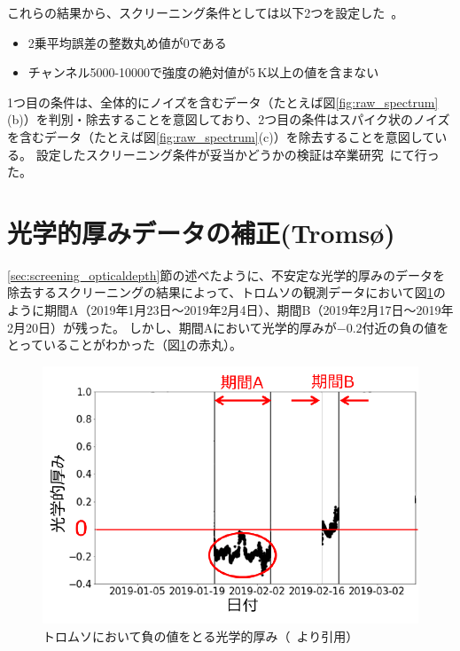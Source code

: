 これらの結果から、スクリーニング条件としては以下2つを設定した~\cite{goto2021bachelor}。
\begin{itemize}
    \item 2乗平均誤差の整数丸め値が0である
    \item チャンネル5000-10000で強度の絶対値が$5\, \mathrm{K}$以上の値を含まない
\end{itemize}
1つ目の条件は、全体的にノイズを含むデータ（たとえば図\ref{fig:raw_spectrum}(b)）を判別・除去することを意図しており、2つ目の条件はスパイク状のノイズを含むデータ（たとえば図\ref{fig:raw_spectrum}(c)）を除去することを意図している。
設定したスクリーニング条件が妥当かどうかの検証は卒業研究~\cite{goto2021bachelor}にて行った。


\section{光学的厚みデータの補正(Troms\o)}
\label{sec:correction_opticaldepth}
\ref{sec:screening_opticaldepth}節の述べたように、不安定な光学的厚みのデータを除去するスクリーニングの結果によって、トロムソの観測データにおいて図\ref{fig:optical_depth_minus}のように期間A（2019年1月23日〜2019年2月4日）、期間B（2019年2月17日〜2019年2月20日）が残った。
しかし、期間Aにおいて光学的厚みが$-0.2$付近の負の値をとっていることがわかった（図\ref{fig:optical_depth_minus}の赤丸）。
\begin{figure}[htbp]
    \centering
    \includegraphics[width=\linewidth]{master_thesis_contents/master_thesis_fig/optical_depth_minus.pdf}
    \caption{トロムソにおいて負の値をとる光学的厚み（~\cite{goto2021bachelor}より引用）}
    \label{fig:optical_depth_minus}
\end{figure}

